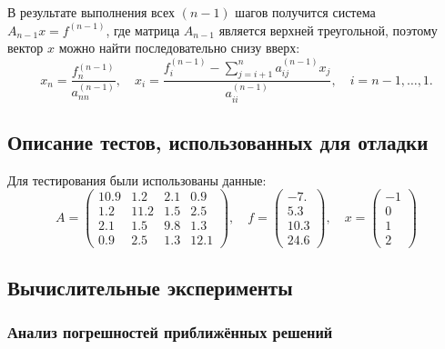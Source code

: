         В результате выполнения всех $(n-1)$ шагов получится система $ A_{n-1} x = f^{(n-1)} $, где матрица $ A_{n-1} $ является верхней треугольной, поэтому вектор $ x $ можно найти последовательно снизу вверх:
        \[
            x_n = \frac{ f_n^{(n-1)} }{ a_{nn}^{(n-1)} }, \quad x_i = \frac{ f_i^{(n-1)} - \sum\limits_{j=i+1}^n a_{ij}^{(n-1)} x_j  }{ a_{ii}^{(n-1)} }, \quad
            i = n-1, \dots, 1.
        \]

    \subsection{Описание тестов, использованных для отладки}
        Для тестирования были использованы данные:
        \[
            A = \left(
                \begin{matrix}
                    10.9 & 1.2 & 2.1 & 0.9 \\
                    1.2 & 11.2 & 1.5 & 2.5 \\
                    2.1 & 1.5 & 9.8 & 1.3 \\
                    0.9 & 2.5 & 1.3 & 12.1
                \end{matrix}
            \right), \quad
            f = \left(
                \begin{matrix}
                    -7. \\
                    5.3 \\
                    10.3 \\
                    24.6
                \end{matrix}
            \right), \quad
            x = \left(
                \begin{matrix}
                    -1 \\
                    0 \\
                    1 \\
                    2
                \end{matrix}
            \right)
        \]


    \subsection{Вычислительные эксперименты}


        \subsubsection{Анализ погрешностей приближённых решений}


